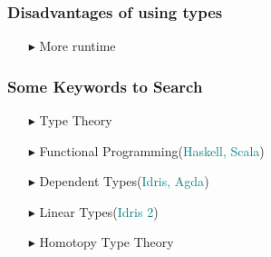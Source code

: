 \documentclass[14pt,compress]{beamer}
\begin{document}
\begin{frame}

\frametitle{Disadvantages of using types}

\begin{enumerate}
\item[$\blacktriangleright$] More runtime
\end{enumerate}

\end{frame}
\begin{frame}
\frametitle{Some Keywords to Search}

\begin{enumerate}
\color{beamer@blendedblue}
\item[$\blacktriangleright$] Type Theory
\item[$\blacktriangleright$] Functional Programming(\textcolor{teal}{Haskell, Scala})
\item[$\blacktriangleright$] Dependent Types(\textcolor{teal}{Idris, Agda})
\item[$\blacktriangleright$] Linear Types(\textcolor{teal}{Idris 2})
\item[$\blacktriangleright$] Homotopy Type Theory
\end{enumerate}
\end{frame}
\end{document}
